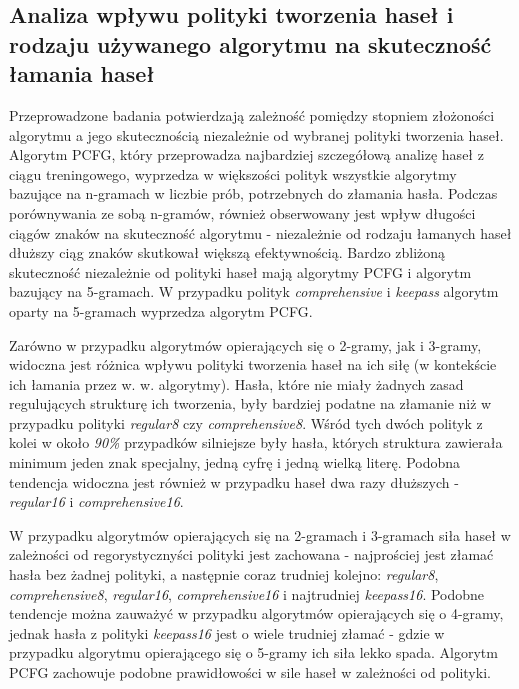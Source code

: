 \documentclass{article}
\begin{document}
	\subsection{Analiza wpływu polityki tworzenia haseł i rodzaju używanego algorytmu na skuteczność łamania haseł}
		Przeprowadzone badania potwierdzają zależność pomiędzy stopniem złożoności algorytmu a jego skutecznością
		niezależnie od wybranej polityki tworzenia haseł. Algorytm PCFG, który przeprowadza najbardziej szczegółową
		analizę haseł z ciągu treningowego, wyprzedza w większości polityk wszystkie algorytmy bazujące na n-gramach w liczbie prób, potrzebnych
		do złamania hasła. Podczas porównywania ze sobą n-gramów, również obserwowany jest wpływ długości ciągów znaków
		na skuteczność algorytmu - niezależnie od rodzaju łamanych haseł dłuższy ciąg znaków skutkował większą efektywnością.
		Bardzo zbliżoną skuteczność niezależnie od polityki haseł mają algorytmy PCFG i algorytm bazujący na 5-gramach.
		W przypadku polityk \textit{comprehensive} i \textit{keepass} algorytm oparty na 5-gramach wyprzedza algorytm PCFG.

		Zarówno w przypadku algorytmów opierających się o 2-gramy, jak i 3-gramy, widoczna jest różnica wpływu polityki
		tworzenia haseł na ich siłę (w kontekście ich łamania przez w. w. algorytmy). Hasła, które nie miały żadnych
		zasad regulujących strukturę ich tworzenia, były bardziej podatne na złamanie niż w przypadku polityki \textit{regular8}
		czy \textit{comprehensive8}. Wśród tych dwóch polityk z kolei w około \textit{90\%} przypadków silniejsze były hasła,
		których struktura zawierała minimum jeden znak specjalny, jedną cyfrę i jedną wielką literę. Podobna tendencja widoczna
		jest również w przypadku haseł dwa razy dłuższych - \textit{regular16} i \textit{comprehensive16}.

		W przypadku algorytmów opierających się na 2-gramach i 3-gramach siła haseł w zależności od regorystycznyści polityki
		jest zachowana - najprościej jest złamać hasła bez żadnej polityki, a następnie coraz trudniej kolejno: \textit{regular8},
		\textit{comprehensive8}, \textit{regular16}, \textit{comprehensive16} i najtrudniej \textit{keepass16}. Podobne
		tendencje można zauważyć w przypadku algorytmów opierających się o 4-gramy, jednak hasła z polityki \textit{keepass16}
		jest o wiele trudniej złamać - gdzie w przypadku algorytmu opierającego się o 5-gramy ich siła lekko spada.
		Algorytm PCFG zachowuje podobne prawidłowości w sile haseł w zależności od polityki.
\end{document}
